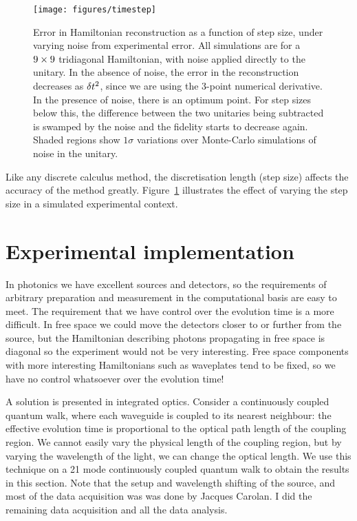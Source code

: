 \begin{figure}[h]
  \centering
  \texttt{[image: figures/timestep]}
  \caption[Error in Hamiltonian reconstruction as a function of step size]
  {Error in Hamiltonian reconstruction as a function of step size, under varying
  noise from experimental error. All simulations are for a \(9 \times 9\)
  tridiagonal Hamiltonian, with noise applied directly to the unitary.
  In the absence of noise, the error in the
  reconstruction decreases as \(\delta t^{2}\), since we are using the 3-point
  numerical derivative. In the presence of noise, there is an optimum point. For
  step sizes below this, the difference between the two unitaries being
  subtracted is swamped by the noise and the fidelity starts to decrease again.
  Shaded regions show \(1 \sigma\) variations over Monte-Carlo simulations of
  noise in the unitary.}
  \label{fig:stepsize}
\end{figure}

Like any discrete calculus method, the discretisation length (step size) affects
the accuracy of the method greatly. Figure~\ref{fig:stepsize} illustrates the
effect of varying the step size in a simulated experimental context.

\section{Experimental implementation}
\label{sec:HTExperiment}
In photonics we have excellent sources and detectors, so the requirements of
arbitrary preparation and measurement in the computational basis are easy to
meet. The requirement that we have control over the evolution time is a more
difficult. In free space we could move the detectors closer to or further from
the source, but the Hamiltonian describing photons propagating in free space is
diagonal so the experiment would not be very interesting. Free space components
with more interesting Hamiltonians such as waveplates tend to be fixed, so we
have no control whatsoever over the evolution time!

A solution is presented in integrated optics. Consider a continuously coupled
quantum walk, where each waveguide is coupled to its nearest neighbour: the
effective evolution time is proportional to the optical path length of the
coupling region. We cannot easily vary the physical length of the coupling
region, but by varying the wavelength of the light, we can change the optical
length. We use this technique on a 21 mode continuously coupled quantum walk to
obtain the results in this section. Note that the setup and wavelength shifting
of the source, and most of the data acquisition was was done by Jacques Carolan.
I did the remaining data acquisition and all the data analysis.

